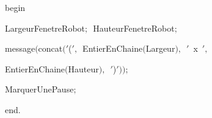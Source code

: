 {\vspace{\neglskip}\mbox{\blc  \idt  \mcl begin\idt }\par 
\vspace{\neglskip}\mbox{\blc  \blk\idt  LargeurFenetreRobot$;$\ HauteurFenetreRobot$;$\ }\par 
\vspace{\neglskip}\mbox{\blc  \blk\idt  message$($concat$($\cha $\scriptstyle '$(\idt $\scriptstyle '$$,$\ EntierEnChaine$($Largeur$)$$,$\ \cha $\scriptstyle '$\ x\ \idt $\scriptstyle '$$,$\ }\par 
\vspace{\neglskip}\mbox{\blc  \blk\blk\blk\idt  EntierEnChaine$($Hauteur$)$$,$\ \cha $\scriptstyle '$)\idt $\scriptstyle '$$)$$)$$;$}\par 
\vspace{\neglskip}\mbox{\blc  \blk\idt  MarquerUnePause$;$\ }\par 
\vspace{\neglskip}\mbox{\blc  \idt  \mcl end\idt $.$}\par 
\medskip


\medskip }

